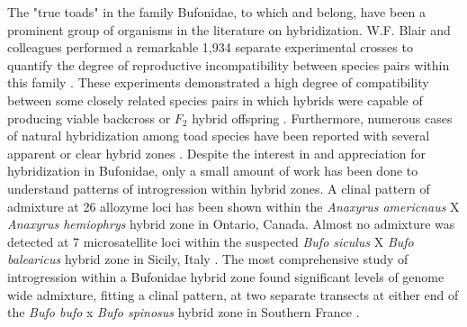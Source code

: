 The "true toads" in the family Bufonidae, to which \amer and \terr belong,  
have been a prominent group of organisms in the literature on hybridization. 
W.F. Blair and colleagues performed a remarkable 1,934 separate experimental crosses 
to quantify the degree of reproductive incompatibility between species pairs within
this family \parencite{blair1972,malone2008}.
These experiments demonstrated a high degree of compatibility between some closely 
related species pairs in which hybrids were capable of producing viable backcross 
or $F_2$ hybrid offspring \parencite{blair1963}.
Furthermore, numerous cases of natural hybridization among toad species have been 
reported with several apparent or clear hybrid zones 
\parencite{green1996,vanriemsdijk2023,colliard2010,weatherby1982}.
Despite the interest in and appreciation for hybridization in Bufonidae, only a 
small amount of work has been done to understand patterns of introgression
within hybrid zones. 
A clinal pattern of admixture at 26 allozyme loci has been shown within the 
\textit{Anaxyrus americnaus} X \textit{Anaxyrus hemiophrys} hybrid zone in 
Ontario, Canada\parencite{green1983}.
Almost no admixture was detected at 7 microsatellite loci within the suspected \textit{Bufo siculus} X 
\textit{Bufo balearicus} hybrid zone in Sicily, Italy \parencite{colliard2010}.
The most comprehensive study of introgression within a Bufonidae hybrid zone found 
significant levels of genome wide admixture, fitting a clinal pattern, at two separate transects 
at either end of the \textit{Bufo bufo} x \textit{Bufo spinosus} hybrid zone
in Southern France \parencite{vanriemsdijk2023}.


